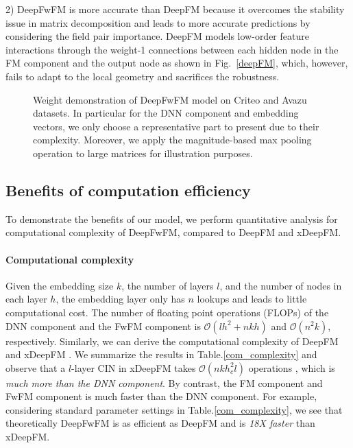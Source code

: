 \documentclass[sigconf]{acmart}
\begin{document}
2) DeepFwFM is more accurate than DeepFM because it overcomes the stability issue in matrix decomposition and leads to more accurate predictions \citep{ffm, fwfm} by considering the field pair importance. DeepFM models low-order feature interactions through the weight-1 connections between each hidden node in the FM component and the output node as shown in Fig.~\ref{deepFM}, which, however, fails to adapt to the local geometry and sacrifices the robustness.


\begin{figure*}[h!]
\centering
  \qquad\qquad
  \qquad\qquad
  \qquad\qquad
  \qquad\qquad
  \caption{Weight demonstration of DeepFwFM model on Criteo and Avazu datasets. In particular for the DNN component and embedding vectors, we only choose a representative part to present due to their complexity. Moreover, we apply the magnitude-based max pooling operation to large matrices for illustration purposes.}
  \label{sparse_r}
  \vspace{1em}
\end{figure*}

\subsection{Benefits of computation efficiency}
\label{complexity}




To demonstrate the benefits of our model, we perform quantitative analysis for computational complexity of DeepFwFM, compared to DeepFM and xDeepFM. 

\paragraph{Computational complexity} Given the embedding size $k$, the number of layers $l$, and the number of nodes in each layer $h$, the embedding layer only has $n$ lookups and leads to
little computational cost. The number of floating point operations (FLOPs) of the DNN component and the FwFM component is $\mathcal{O}(lh^2+nkh)$ and $\mathcal{O}(n^2k)$, respectively. Similarly, we can derive the computational complexity of DeepFM \citep{deepfm}
 and xDeepFM \citep{xdeepfm}. We summarize the results in Table.\ref{com_complexity} and observe that a $l$-layer CIN in xDeepFM takes $\mathcal{O}(nkh_c^2l)$ operations \cite{xdeepfm}, which is \emph{much more than the DNN component}. By contrast, the FM component and FwFM component is much faster than the DNN component. For example, considering standard parameter settings in Table.\ref{com_complexity}, we see that theoretically DeepFwFM is as efficient as DeepFM and is \emph{18X faster} than xDeepFM.
 
\end{document}

